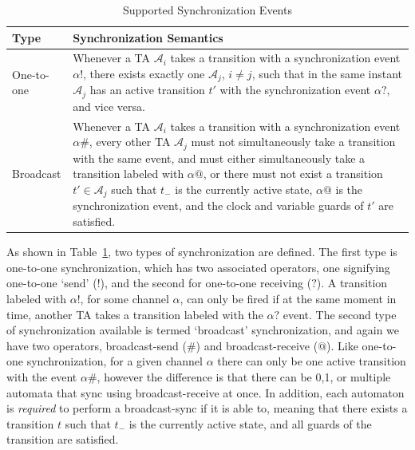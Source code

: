 \documentclass[a4paper,11pt]{report}
\theoremstyle{definition}
\begin{document}
\begin{table}
  \centering
  \begin{tabular}{l p{}}
    \textbf{Type} & \textbf{Synchronization Semantics} \\
    \midrule
    One-to-one & Whenever a TA $\mathcal{A}_{i}$ takes a transition with a
                 synchronization event $\alpha{!}$, there exists exactly one
                 $\mathcal{A}_{j}$, $i\neq j$, such that in the same instant
                 $\mathcal{A}_{j}$ has an active transition $t'$ with the
                 synchronization event $\alpha{?}$, and vice versa. \\
    \midrule
    Broadcast &  Whenever a TA $\mathcal{A}_{i}$ takes a transition with a
                synchronization event $\alpha\#$, every other TA
                $\mathcal{A}_{j}$ must not simultaneously take a transition with
                the same event, and must either simultaneously take a transition
                labeled with $\alpha @$, or there must not exist a transition
                $t' \in \mathcal{A}_{j}$ such that $t_{-}$ is the currently
                active state, $\alpha @$ is the synchronization event, and the
                clock and variable guards of $t'$ are satisfied.
    \\
    \midrule
  \end{tabular}
  \caption{Supported Synchronization Events}
  \label{table:sync-def}
\end{table}

As shown in Table~\ref{table:sync-def}, two types of synchronization are
defined. The first type is one-to-one synchronization, which has two associated
operators, one signifying one-to-one `send' (${!}$), and the second for
one-to-one receiving (${?}$). A transition labeled with $\alpha{!}$, for some
channel $\alpha$, can only be fired if at the same moment in time, another TA
takes a transition labeled with the $\alpha{?}$ event. The second type of
synchronization available is termed `broadcast' synchronization, and again we
have two operators, broadcast-send ($\#$) and broadcast-receive (${@}$). Like
one-to-one synchronization, for a given channel $\alpha$ there can only be one
active transition with the event $\alpha\#$, however the difference is that
there can be 0,1, or multiple automata that sync using broadcast-receive at
once. In addition, each automaton is \emph{required} to perform a broadcast-sync
if it is able to, meaning that there exists a transition $t$ such that $t_{-}$
is the currently active state, and all guards of the transition are satisfied.
\end{document}
